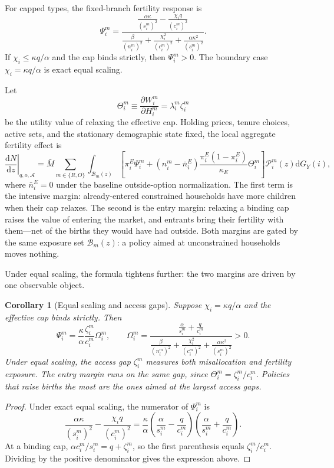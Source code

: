 \documentclass[11pt]{article}
\newtheorem{corollary}{Corollary}
\newcommand{\dd}{\mathrm d}
\newcommand{\1}{\mathbf 1}
\begin{document}
For capped types, the fixed-branch fertility response is
\[
\Psi_i^m
=
\frac{
\frac{\alpha\kappa}{(s_i^m)^2}
-
\frac{\chi_i q}{(c_i^m)^2}
}{
\frac{\beta}{(n_i^m)^2}
+
\frac{\chi_i^2}{(c_i^m)^2}
+
\frac{\alpha\kappa^2}{(s_i^m)^2}
}.
\]
If $\chi_i\le \kappa q/\alpha$ and the cap binds strictly, then $\Psi_i^m>0$. The boundary case $\chi_i=\kappa q/\alpha$ is exact equal scaling.

Let
\[
\Theta_i^m
\equiv
\frac{\partial W_i^m}{\partial H_i^m}
=
\lambda_i^m\zeta_i^m
\]
be the utility value of relaxing the effective cap. Holding prices, tenure choices, active sets, and the stationary demographic state fixed, the local aggregate fertility effect is
\[
\left.\frac{\dd N}{\dd z}\right|_{q,o,\mathcal A}
=
\bar M
\sum_{m\in\{R,O\}}
\int_{\mathcal B_m(z)}
\left[
\pi_i^E\Psi_i^m
+
(n_i^m-\bar n_i^E)
\frac{\pi_i^E(1-\pi_i^E)}{\kappa_E}
\Theta_i^m
\right]
\mathcal P_i^m(z)
\dd G_Y(i),
\]
where $\bar n_i^E=0$ under the baseline outside-option normalization. The first term is the intensive margin: already-entered constrained households have more children when their cap relaxes. The second is the entry margin: relaxing a binding cap raises the value of entering the market, and entrants bring their fertility with them---net of the births they would have had outside. Both margins are gated by the same exposure set $\mathcal B_m(z)$: a policy aimed at unconstrained households moves nothing.

Under equal scaling, the formula tightens further: the two margins are driven by one observable object.

\begin{corollary}[Equal scaling and access gaps]
Suppose $\chi_i=\kappa q/\alpha$ and the effective cap binds strictly. Then
\[
\Psi_i^m
=
\frac{\kappa}{\alpha}
\frac{\zeta_i^m}{c_i^m}
\Omega_i^m,
\qquad
\Omega_i^m
=
\frac{
\frac{\alpha}{s_i^m}+\frac{q}{c_i^m}
}{
\frac{\beta}{(n_i^m)^2}
+
\frac{\chi_i^2}{(c_i^m)^2}
+
\frac{\alpha\kappa^2}{(s_i^m)^2}
}
>0.
\]
Under equal scaling, the access gap $\zeta_i^m$ measures both misallocation and fertility exposure. The entry margin runs on the same gap, since $\Theta_i^m=\zeta_i^m/c_i^m$. Policies that raise births the most are the ones aimed at the largest access gaps.
\end{corollary}

\begin{proof}
Under exact equal scaling, the numerator of $\Psi_i^m$ is
\[
\frac{\alpha\kappa}{(s_i^m)^2}
-
\frac{\chi_i q}{(c_i^m)^2}
=
\frac{\kappa}{\alpha}
\left(\frac{\alpha}{s_i^m}-\frac{q}{c_i^m}\right)
\left(\frac{\alpha}{s_i^m}+\frac{q}{c_i^m}\right).
\]
At a binding cap, $\alpha c_i^m/s_i^m=q+\zeta_i^m$, so the first parenthesis equals $\zeta_i^m/c_i^m$. Dividing by the positive denominator gives the expression above.
\end{proof}
\end{document}
